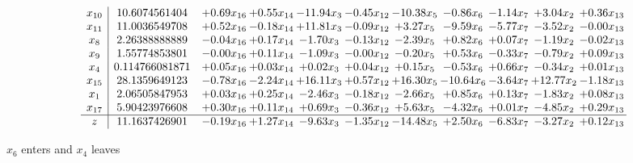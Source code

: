 \documentclass[9pt]{article}
\begin{document}
 \[\begin{array}{c| c c@{\hskip 2pt} c@{\hskip 2pt} c@{\hskip 2pt} c@{\hskip 2pt} c@{\hskip 2pt} c@{\hskip 2pt} c@{\hskip 2pt} c@{\hskip 2pt} c@{\hskip 2pt} }
 x_{10}   &  10.6074561404 & +  0.69 x_{16} & +  0.55 x_{14} & -11.94 x_{3} & -0.45 x_{12} & -10.38 x_{5} & -0.86 x_{6} & -1.14 x_{7} & +  3.04 x_{2} & +  0.36 x_{13}\\
 x_{11}   &  11.0036549708 & +  0.52 x_{16} & -0.18 x_{14} & + 11.81 x_{3} & -0.09 x_{12} & +  3.27 x_{5} & -9.59 x_{6} & -5.77 x_{7} & -3.52 x_{2} & -0.00 x_{13}\\
 x_{8}   &  2.26388888889 & -0.04 x_{16} & +  0.17 x_{14} & -1.70 x_{3} & -0.13 x_{12} & -2.39 x_{5} & +  0.82 x_{6} & +  0.07 x_{7} & -1.19 x_{2} & -0.02 x_{13}\\
 x_{9}   &  1.55774853801 & -0.00 x_{16} & +  0.11 x_{14} & -1.09 x_{3} & -0.00 x_{12} & -0.20 x_{5} & +  0.53 x_{6} & -0.33 x_{7} & -0.79 x_{2} & +  0.09 x_{13}\\
 x_{4}   &  0.114766081871 & +  0.05 x_{16} & +  0.03 x_{14} & +  0.02 x_{3} & +  0.04 x_{12} & +  0.15 x_{5} & -0.53 x_{6} & +  0.66 x_{7} & -0.34 x_{2} & +  0.01 x_{13}\\
 x_{15}   &  28.1359649123 & -0.78 x_{16} & -2.24 x_{14} & + 16.11 x_{3} & +  0.57 x_{12} & + 16.30 x_{5} & -10.64 x_{6} & -3.64 x_{7} & + 12.77 x_{2} & -1.18 x_{13}\\
 x_{1}   &  2.06505847953 & +  0.03 x_{16} & +  0.25 x_{14} & -2.46 x_{3} & -0.18 x_{12} & -2.66 x_{5} & +  0.85 x_{6} & +  0.13 x_{7} & -1.83 x_{2} & +  0.08 x_{13}\\
 x_{17}   &  5.90423976608 & +  0.30 x_{16} & +  0.11 x_{14} & +  0.69 x_{3} & -0.36 x_{12} & +  5.63 x_{5} & -4.32 x_{6} & +  0.01 x_{7} & -4.85 x_{2} & +  0.29 x_{13}\\
\hline
z    &  11.1637426901 & -0.19 x_{16} & +  1.27 x_{14} & -9.63 x_{3} & -1.35 x_{12} & -14.48 x_{5} & +  2.50 x_{6} & -6.83 x_{7} & -3.27 x_{2} & +  0.12 x_{13}\\
\end{array}\]


 $ x_{6} $ enters and $ x_{4} $ leaves 
\end{document}
